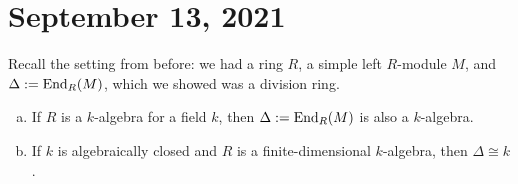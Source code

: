 \section{September 13, 2021}
Recall the setting from before: we had a ring $R$, a simple left $R$-module $M$,
and $\Delta := \operatorname{End}_R(M)$, which we showed was a division ring. 

\begin{prop}{}
\begin{enumerate}[(a)]
    \item If $R$ is a $k$-algebra for a field $k$, then $\Delta := \operatorname{End}_R(M)$ is also a $k$-algebra. 
    \item If $k$ is algebraically closed and $R$ is a finite-dimensional $k$-algebra, then $\Delta 
    \cong k$. 
\end{enumerate}
\end{prop}
